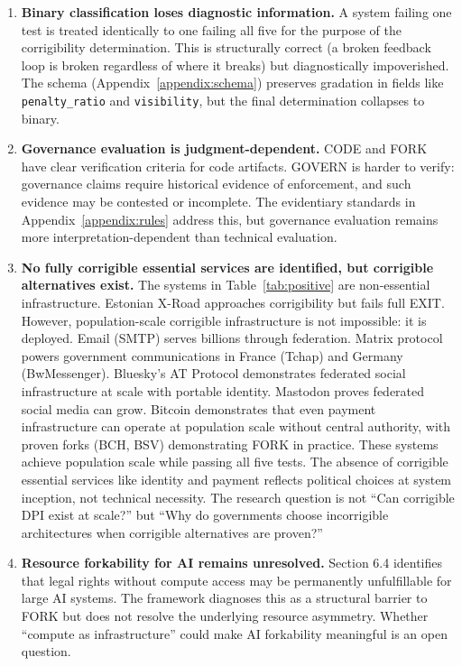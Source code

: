 \documentclass{article}
\begin{document}
\begin{enumerate}
    \item \textbf{Binary classification loses diagnostic information.} A system failing one test is treated identically to one failing all five for the purpose of the corrigibility determination. This is structurally correct (a broken feedback loop is broken regardless of where it breaks) but diagnostically impoverished. The schema (Appendix~\ref{appendix:schema}) preserves gradation in fields like \texttt{penalty\_ratio} and \texttt{visibility}, but the final determination collapses to binary.

    \item \textbf{Governance evaluation is judgment-dependent.} CODE and FORK have clear verification criteria for code artifacts. GOVERN is harder to verify: governance claims require historical evidence of enforcement, and such evidence may be contested or incomplete. The evidentiary standards in Appendix~\ref{appendix:rules} address this, but governance evaluation remains more interpretation-dependent than technical evaluation.

    \item \textbf{No fully corrigible essential services are identified, but corrigible alternatives exist.} The systems in Table~\ref{tab:positive} are non-essential infrastructure. Estonian X-Road approaches corrigibility but fails full EXIT. However, population-scale corrigible infrastructure is not impossible: it is deployed. Email (SMTP) serves billions through federation. Matrix protocol powers government communications in France (Tchap) and Germany (BwMessenger). Bluesky's AT Protocol demonstrates federated social infrastructure at scale with portable identity. Mastodon proves federated social media can grow. Bitcoin demonstrates that even payment infrastructure can operate at population scale without central authority, with proven forks (BCH, BSV) demonstrating FORK in practice. These systems achieve population scale while passing all five tests. The absence of corrigible essential services like identity and payment reflects political choices at system inception, not technical necessity. The research question is not ``Can corrigible DPI exist at scale?'' but ``Why do governments choose incorrigible architectures when corrigible alternatives are proven?''

    \item \textbf{Resource forkability for AI remains unresolved.} Section 6.4 identifies that legal rights without compute access may be permanently unfulfillable for large AI systems. The framework diagnoses this as a structural barrier to FORK but does not resolve the underlying resource asymmetry. Whether ``compute as infrastructure'' could make AI forkability meaningful is an open question.


\end{enumerate}
\end{document}
